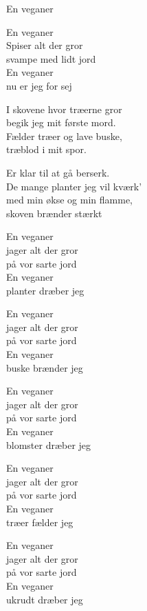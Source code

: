 \begin{song}{En veganer}
  \begin{SBChorus}
    En veganer\\
    Spiser alt der gror\\
    svampe med lidt jord\\
    En veganer\\
    nu er jeg for sej
  \end{SBChorus}

  \begin{SBVerse}
    I skovene hvor træerne gror\\
    begik jeg mit første mord.\\
    Fælder træer og lave buske,\\
    træblod i mit spor.
  \end{SBVerse}

  \begin{SBVerse}
    Er klar til at gå berserk.\\
    De mange planter jeg vil kværk'\\
    med min økse og min flamme,\\
    skoven brænder stærkt 
  \end{SBVerse}

  \begin{SBChorus}
    En veganer\\
    jager alt der gror\\
    på vor sarte jord\\
    En veganer\\
    planter dræber jeg
  \end{SBChorus}

  \begin{SBChorus}
    En veganer\\
    jager alt der gror\\
    på vor sarte jord\\
    En veganer\\
    buske brænder jeg
  \end{SBChorus}

  \begin{SBChorus}
    En veganer\\
    jager alt der gror\\
    på vor sarte jord\\
    En veganer\\
    blomster dræber jeg
  \end{SBChorus}

  \begin{SBChorus}
    En veganer\\
    jager alt der gror\\
    på vor sarte jord\\
    En veganer\\
    træer fælder jeg
  \end{SBChorus}

  \begin{SBChorus}
    En veganer\\
    jager alt der gror\\
    på vor sarte jord\\
    En veganer\\
    ukrudt dræber jeg
  \end{SBChorus}
\end{song}